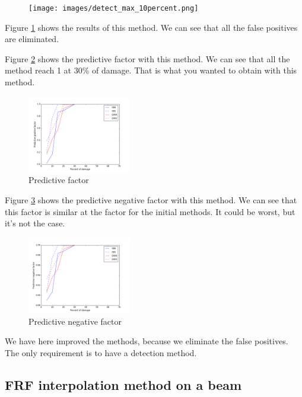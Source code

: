 \documentclass[journal]{IEEEtran}
\begin{document}
\begin{figure}[h!]
  \centering
  \texttt{[image: images/detect\_max\_10percent.png]}
  \caption{}
  \label{detect_max}
\end{figure}

Figure \ref{detect_max} shows the results of this method. We can see that all the false positives are eliminated.


Figure \ref{pred_max} shows the predictive factor with this method. We can see that all the method reach 1 at 30\% of damage. That is what you wanted to obtain with this method.

\begin{figure}[h!]
  \centering
  \includegraphics[width=0.4\textwidth]{images/pred_max.png}
  \caption{Predictive factor}
  \label{pred_max}
\end{figure}

Figure \ref{pred_neg_max} shows the predictive negative factor with this method. We can see that this factor is similar at the factor for the initial methods. It could be worst, but it's not the case.

\begin{figure}[h!]
  \centering
  \includegraphics[width=0.4\textwidth]{images/pred_neg_max.png}
  \caption{Predictive negative factor}
  \label{pred_neg_max}
\end{figure}

We have here improved the methods, because we eliminate the false positives. The only requirement is to have a detection method.

\subsection{FRF interpolation method on a beam}
\end{document}
